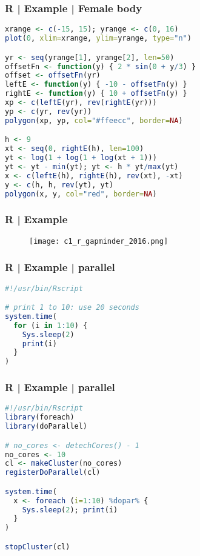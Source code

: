 \begin{frame}[fragile]
  \frametitle{R | Example | Female body}
  \vspace{-1.5em}
\begin{lstlisting}[language=R,basicstyle=\footnotesize\tt]
xrange <- c(-15, 15); yrange <- c(0, 16)
plot(0, xlim=xrange, ylim=yrange, type="n")

yr <- seq(yrange[1], yrange[2], len=50)
offsetFn <- function(y) { 2 * sin(0 + y/3) }
offset <- offsetFn(yr)
leftE <- function(y) { -10 - offsetFn(y) }
rightE <- function(y) { 10 + offsetFn(y) }
xp <- c(leftE(yr), rev(rightE(yr)))
yp <- c(yr, rev(yr))
polygon(xp, yp, col="#ffeecc", border=NA)

h <- 9
xt <- seq(0, rightE(h), len=100)
yt <- log(1 + log(1 + log(xt + 1)))
yt <- yt - min(yt); yt <- h * yt/max(yt)
x <- c(leftE(h), rightE(h), rev(xt), -xt)
y <- c(h, h, rev(yt), yt)
polygon(x, y, col="red", border=NA)
\end{lstlisting}
\end{frame}

\begin{frame}
  \frametitle{R | Example}
  \begin{figure}
    \centering
    \texttt{[image: c1\_r\_gapminder\_2016.png]}
  \end{figure}
\end{frame}

\begin{frame}[fragile]
  \frametitle{R | Example | parallel}
\begin{lstlisting}[language=R]
#!/usr/bin/Rscript

# print 1 to 10: use 20 seconds
system.time(
  for (i in 1:10) {
    Sys.sleep(2)
    print(i)
  }
)
\end{lstlisting}
\end{frame}

\begin{frame}[fragile]
  \frametitle{R | Example | parallel}
  \vspace{-0.5em}
\begin{lstlisting}[language=R]
#!/usr/bin/Rscript
library(foreach)
library(doParallel)

# no_cores <- detechCores() - 1
no_cores <- 10
cl <- makeCluster(no_cores)
registerDoParallel(cl)

system.time(
  x <- foreach (i=1:10) %dopar% {
    Sys.sleep(2); print(i)
  }
)

stopCluster(cl)
\end{lstlisting}
\end{frame}

